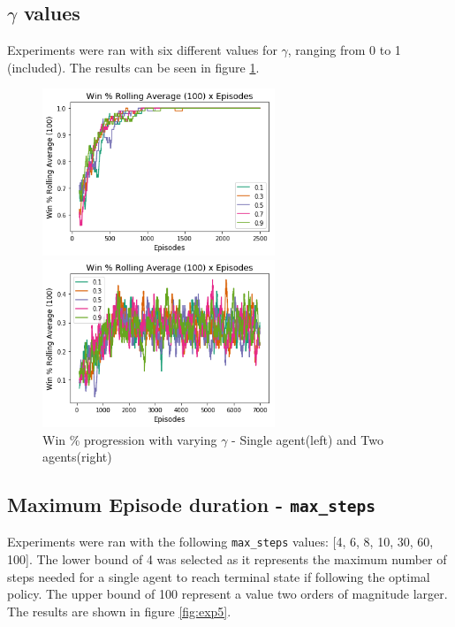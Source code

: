 \documentclass[10pt]{article}
\begin{document}
    \subsection{$\gamma$ values}
        Experiments were ran with six different values for $\gamma$, ranging from 0 to 1 (included). The results can be seen in figure \ref{fig:exp4}.
        \begin{figure}[h]
            \centering
            \begin{minipage}[b]{0.4\textwidth}
                \includegraphics[height=5cm]{Images/exp_4/1_win_percent.png}
            \end{minipage}
            \hfill
            \begin{minipage}[b]{0.4\textwidth}
                \includegraphics[height=5cm]{Images/exp_4/2_win_percent.png}
            \end{minipage}
            \caption{Win \% progression with varying $\gamma$ - Single agent(left) and Two agents(right)}
            \label{fig:exp4}
        \end{figure}

    \subsection{Maximum Episode duration - \texttt{max\_steps}}
        Experiments were ran with the following \texttt{max\_steps} values: [4, 6, 8, 10, 30, 60, 100]. The lower bound of 4 was selected as it represents the maximum number of steps needed for a single agent to reach terminal state if following the optimal policy. The upper bound of 100 represent a value two orders of magnitude larger. The results are shown in figure \ref{fig:exp5}.
\end{document}
